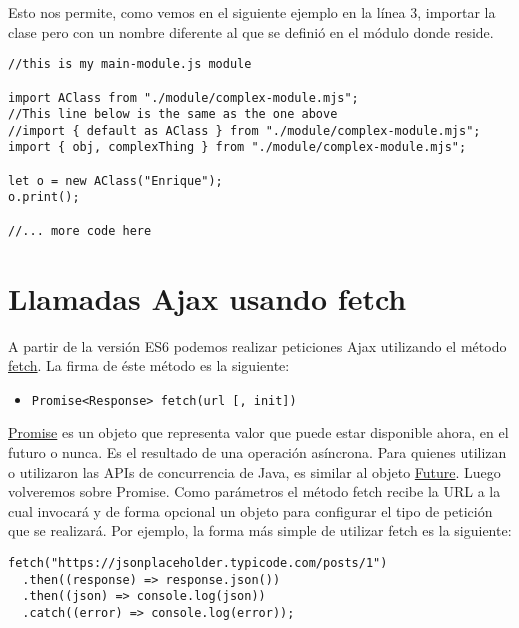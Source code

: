 \documentclass[a4paper, oneside, titlepage, 12pt]{paper}
\begin{document}
Esto nos permite, como vemos en el siguiente ejemplo en la línea 3, importar la clase pero con un nombre diferente al que se definió en el módulo donde reside.

\begin{verbatim}
//this is my main-module.js module

import AClass from "./module/complex-module.mjs";
//This line below is the same as the one above
//import { default as AClass } from "./module/complex-module.mjs";
import { obj, complexThing } from "./module/complex-module.mjs";

let o = new AClass("Enrique");
o.print();

//... more code here
\end{verbatim}

\section{Llamadas Ajax usando fetch}

A partir de la versión ES6 podemos realizar peticiones Ajax utilizando el método \href{https://developer.mozilla.org/es/docs/Web/API/WindowOrWorkerGlobalScope/fetch}{fetch}. La firma de éste método es la siguiente:

\begin{itemize}
 \item \texttt{Promise<Response> fetch(url [, init])} 
\end{itemize}

\href{https://developer.mozilla.org/es/docs/Web/JavaScript/Reference/Global_Objects/Promise}{Promise} es un objeto que representa valor que puede estar disponible ahora, en el futuro o nunca. Es el resultado de una operación asíncrona. Para quienes utilizan o utilizaron las APIs de concurrencia de Java, es similar al objeto \href{https://docs.oracle.com/javase/7/docs/api/java/util/concurrent/Future.html}{Future}. Luego volveremos sobre Promise. Como parámetros el método fetch recibe la URL a la cual invocará y de forma opcional un objeto para configurar el tipo de petición que se realizará. Por ejemplo, la forma más simple de utilizar fetch es la siguiente:

\begin{verbatim}
fetch("https://jsonplaceholder.typicode.com/posts/1")
  .then((response) => response.json())
  .then((json) => console.log(json))
  .catch((error) => console.log(error));
\end{verbatim}
\end{document}
